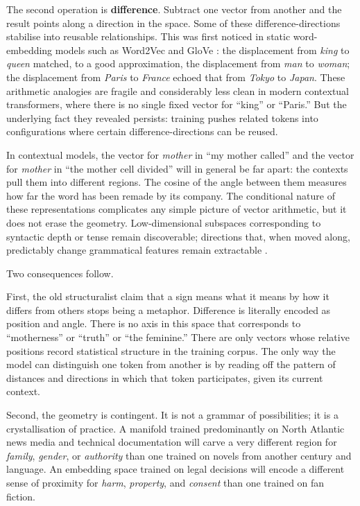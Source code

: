 \documentclass[12pt,a4paper]{article}
\begin{document}
The second operation is \textbf{difference}. Subtract one vector from another and the result points along a direction in the space. Some of these difference-directions stabilise into reusable relationships. This was first noticed in static word-embedding models such as Word2Vec \cite{mikolov2013} and GloVe \cite{pennington2014}: the displacement from \emph{king} to \emph{queen} matched, to a good approximation, the displacement from \emph{man} to \emph{woman}; the displacement from \emph{Paris} to \emph{France} echoed that from \emph{Tokyo} to \emph{Japan}. These arithmetic analogies are fragile and considerably less clean in modern contextual transformers, where there is no single fixed vector for ``king'' or ``Paris.'' But the underlying fact they revealed persists: training pushes related tokens into configurations where certain difference-directions can be reused.

In contextual models, the vector for \emph{mother} in ``my mother called'' and the vector for \emph{mother} in ``the mother cell divided'' will in general be far apart: the contexts pull them into different regions. The cosine of the angle between them measures how far the word has been remade by its company. The conditional nature of these representations complicates any simple picture of vector arithmetic, but it does not erase the geometry. Low-dimensional subspaces corresponding to syntactic depth or tense remain discoverable; directions that, when moved along, predictably change grammatical features remain extractable \cite{hewitt2019}.

Two consequences follow.

First, the old structuralist claim that a sign means what it means by how it differs from others stops being a metaphor. Difference is literally encoded as position and angle. There is no axis in this space that corresponds to ``motherness'' or ``truth'' or ``the feminine.'' There are only vectors whose relative positions record statistical structure in the training corpus. The only way the model can distinguish one token from another is by reading off the pattern of distances and directions in which that token participates, given its current context.

Second, the geometry is contingent. It is not a grammar of possibilities; it is a crystallisation of practice. A manifold trained predominantly on North Atlantic news media and technical documentation will carve a very different region for \emph{family}, \emph{gender}, or \emph{authority} than one trained on novels from another century and language. An embedding space trained on legal decisions will encode a different sense of proximity for \emph{harm}, \emph{property}, and \emph{consent} than one trained on fan fiction.
\end{document}
